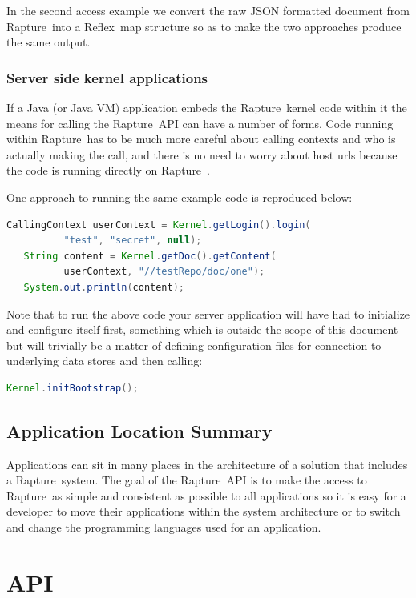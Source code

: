 \documentclass[12pt,twoside,a4paper]{book}
\newcommand{\Rapture}{Rapture~}
\newcommand{\Reflex}{Reflex~}
\begin{document}
In the second access example we convert the raw JSON formatted document from
\Rapture into a \Reflex map structure so as to make the two approaches produce
the same output.

\section{Server side kernel applications}

If a Java (or Java VM) application embeds the \Rapture kernel code within it the
means for calling the \Rapture API can have a number of forms. Code running within
\Rapture has to be much more careful about calling contexts and who is actually
making the call, and there is no need to worry about host urls because the code
is running directly on \Rapture.

One approach to running the same example code is reproduced below:

\begin{lstlisting}[caption={Kernel simple example}, language=Java]
   CallingContext userContext = Kernel.getLogin().login(
          "test", "secret", null);
   String content = Kernel.getDoc().getContent(
          userContext, "//testRepo/doc/one");
   System.out.println(content);
\end{lstlisting}

Note that to run the above code your server application will have had to initialize
and configure itself first, something which is outside the scope of this document
but will trivially be a matter of defining configuration files for connection to
underlying data stores and then calling:

\begin{lstlisting}[caption={Kernel initialization}, language=Java]
   Kernel.initBootstrap();
\end{lstlisting}

\chapter{Application Location Summary}
Applications can sit in many places in the architecture of a solution that
includes a \Rapture system. The goal of the \Rapture API is to make the access
to \Rapture as simple and consistent as possible to all applications so it is
easy for a developer to move their applications within the system architecture or
to switch and change the programming languages used for an application.

\part{API}
\end{document}
